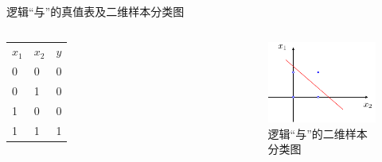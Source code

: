 \documentclass[xcolor=svgnames]{beamer}
\begin{document}
\begin{frame}{逻辑``与''的真值表及二维样本分类图}
  \begin{columns}
    \begin{table}
      \centering
      \begin{tabular}[b] {lll}
        $x_1$ & $x_2$ & $y$ \\
        0 & 0 & 0\\
        0 & 1 & 0\\
        1 & 0 & 0\\
        1 & 1 & 1\\
      \end{tabular}
    \end{table}
    \begin{figure}
      \centering
      \includegraphics[width=\textwidth]{fig32.pdf}
      \caption{逻辑``与''的二维样本分类图}
      \label{fig:logicand}
    \end{figure}
  \end{columns}
\end{frame}
\end{document}
